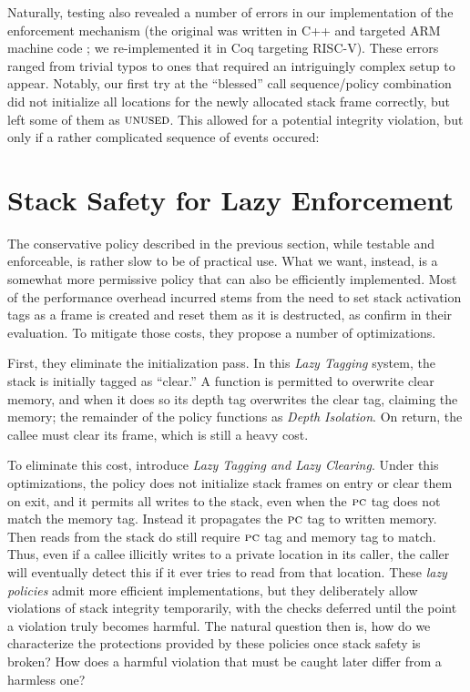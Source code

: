 \documentclass[acmsmall,review,anonymous]{acmart}\settopmatter{printfolios=true,printccs=false,printacmref=false}
\begin{document}
Naturally, testing also revealed a number of errors in our
implementation of the enforcement mechanism (the original was written in C++
and targeted ARM machine code
; we re-implemented it in Coq targeting
RISC-V).  These errors ranged from trivial typos to
ones that required an
intriguingly complex setup to appear.  Notably, our first try at the
``blessed'' call sequence/policy combination did not initialize all
locations for the newly allocated stack frame correctly, but left some
of them as $\textsc{unused}$. This allowed for a potential integrity
violation, but only if a rather complicated sequence of events
occured: 

\section{Stack Safety for Lazy Enforcement}
\label{sec:lazy}

The conservative policy described in the previous section, while
testable and enforceable, is rather slow to be of practical use. What
we want, instead, is a somewhat more permissive policy that can also
be efficiently implemented. Most of the performance overhead incurred
stems from the need to set stack activation tags as a frame is created
and reset them as it is destructed, as
\citet{DBLP:conf/sp/RoesslerD18} confirm in their evaluation. To
mitigate those costs, they propose a number of optimizations.

First, they eliminate the initialization pass. In this {\em Lazy Tagging}
system, the stack is initially tagged as ``clear.'' A function is permitted
to overwrite clear memory, and when it does so its depth tag overwrites
the clear tag, claiming the memory; the remainder of the policy functions
as {\em Depth Isolation}. On return, the callee must clear its frame, which
is still a heavy cost.

To eliminate this cost, \citet{DBLP:conf/sp/RoesslerD18} introduce
{\em Lazy Tagging and Lazy Clearing}. Under this optimizations,
the policy does not initialize stack frames on entry or clear them on exit,
and it permits all writes to the stack, even when the $\textsc{pc}$ tag
does not match the memory tag. Instead it propagates the \(\textsc{pc}\) tag
to written memory. Then reads from the stack do still require $\textsc{pc}$
tag and memory tag to match. Thus, even if a callee illicitly writes to
a private location in its caller, the caller will eventually detect this
if it ever tries to read from that location.
%
These \emph{lazy policies} admit more efficient implementations, but
they deliberately allow violations of stack integrity temporarily,
with the checks deferred until the point a violation truly becomes
harmful. The natural question then is, how do we characterize the
protections provided by these policies once stack safety is broken?
How does a harmful violation that must be caught later differ from a
harmless one?
\end{document}
